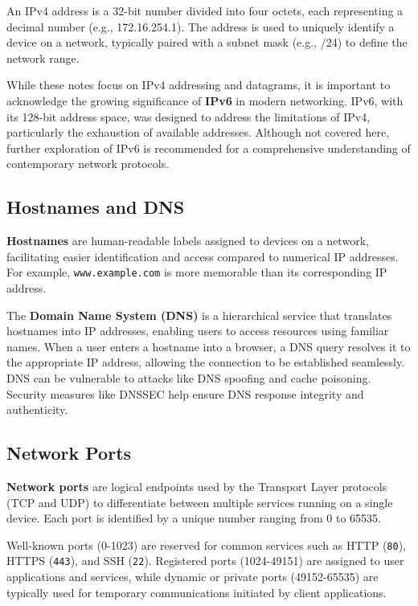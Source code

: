 An IPv4 address is a 32-bit number divided into four octets, each representing a decimal number (e.g., 172.16.254.1). The address is used to uniquely identify a device on a network, typically paired with a subnet mask (e.g., /24) to define the network range.

\begin{observationblock}[IPv6]
    While these notes focus on IPv4 addressing and datagrams, it is important to acknowledge the growing significance of \textbf{IPv6} in modern networking. IPv6, with its 128-bit address space, was designed to address the limitations of IPv4, particularly the exhaustion of available addresses. Although not covered here, further exploration of IPv6 is recommended for a comprehensive understanding of contemporary network protocols.
\end{observationblock}

\subsection{Hostnames and DNS}
\label{hostnames_dns}

\textbf{Hostnames} are human-readable labels assigned to devices on a network, facilitating easier identification and access compared to numerical IP addresses. For example, \texttt{www.example.com} is more memorable than its corresponding IP address.

The \textbf{Domain Name System (DNS)} is a hierarchical service that translates hostnames into IP addresses, enabling users to access resources using familiar names. When a user enters a hostname into a browser, a DNS query resolves it to the appropriate IP address, allowing the connection to be established seamlessly. DNS can be vulnerable to attacks like DNS spoofing and cache poisoning. Security measures like DNSSEC help ensure DNS response integrity and authenticity.

\subsection{Network Ports}
\label{network_ports}

\textbf{Network ports} are logical endpoints used by the Transport Layer protocols (TCP and UDP) to differentiate between multiple services running on a single device. Each port is identified by a unique number ranging from 0 to 65535.

Well-known ports (0-1023) are reserved for common services such as HTTP (\texttt{80}), HTTPS (\texttt{443}), and SSH (\texttt{22}). Registered ports (1024-49151) are assigned to user applications and services, while dynamic or private ports (49152-65535) are typically used for temporary communications initiated by client applications.


